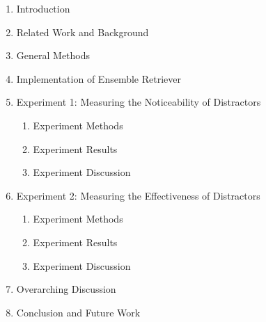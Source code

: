 \begin{enumerate}
    \item Introduction
    \item Related Work and Background
    \item General Methods
    \item Implementation of Ensemble Retriever
    \item Experiment 1: Measuring the Noticeability of Distractors
    \begin{enumerate}
        \item Experiment Methods
        \item Experiment Results
        \item Experiment Discussion
    \end{enumerate}
    \item Experiment 2: Measuring the Effectiveness of Distractors
    \begin{enumerate}
        \item Experiment Methods
        \item Experiment Results
        \item Experiment Discussion
    \end{enumerate}
    \item Overarching Discussion
    \item Conclusion and Future Work
\end{enumerate}